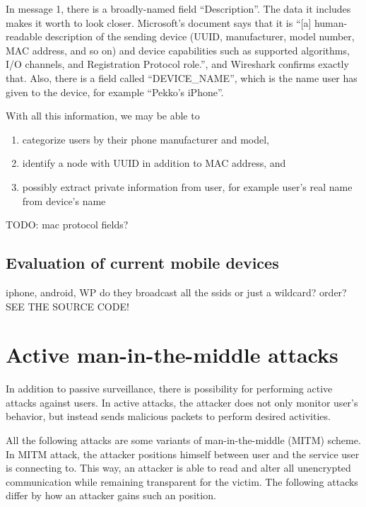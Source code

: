 \documentclass[12pt,a4paper,oneside,pdftex]{report}
\begin{document}
In message 1, there is a broadly-named field ``Description''. The data it includes makes it worth to look closer. Microsoft's document says that it is ``[a] human-readable description of the sending device (UUID, manufacturer, model number, MAC address, and so on) and device capabilities such as supported algorithms, I/O channels, and Registration Protocol role.'', and Wireshark confirms exactly that. Also, there is a field called ``DEVICE\_NAME'', which is the name user has given to the device, for example ``Pekko's iPhone''.

With all this information, we may be able to
\begin{enumerate}
    \item categorize users by their phone manufacturer and model,
    \item identify a node with UUID in addition to MAC address, and
    \item possibly extract private information from user, for example user's real name from device's name
\end{enumerate}

TODO: mac protocol fields?

\section{Evaluation of current mobile devices}
\label{subsec:evaluation}
iphone, android, WP
do they broadcast all the ssids or just a wildcard?
order? SEE THE SOURCE CODE!




\chapter{Active man-in-the-middle attacks}
\label{chapter:attacks}

In addition to passive surveillance, there is possibility for performing active attacks against users. In active attacks, the attacker does not only monitor user's behavior, but instead sends malicious packets to perform desired activities. 

All the following attacks are some variants of man-in-the-middle (MITM) scheme. In MITM attack, the attacker positions himself between user and the service user is connecting to. This way, an attacker is able to read and alter all unencrypted communication while remaining transparent for the victim. The following attacks differ by how an attacker gains such an position.
\end{document}
